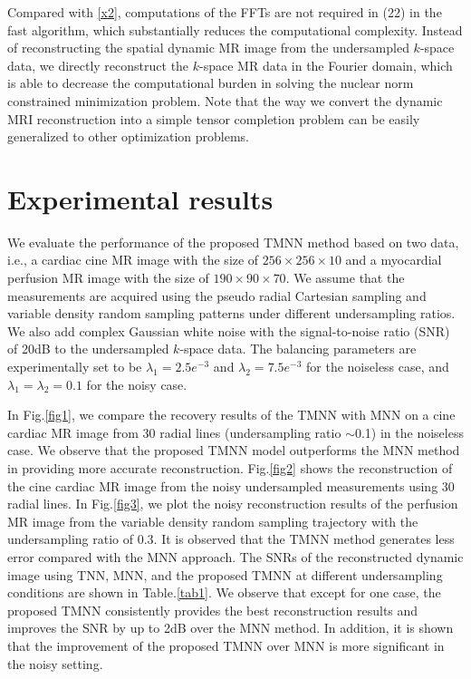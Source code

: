 \documentclass{article}
\begin{document}
Compared with \eqref{x2}, computations of the FFTs are not required in (22) in the fast algorithm, which substantially reduces the computational complexity. Instead of reconstructing the spatial dynamic MR image from the undersampled $k$-space data, we directly reconstruct the $k$-space MR data in the Fourier domain, which is able to decrease the computational burden in solving the nuclear norm constrained minimization problem. 
Note that the way we convert the dynamic MRI reconstruction into a simple tensor completion problem can be easily generalized to other optimization problems. 


\section{Experimental results}
\label{experiments}

We evaluate the performance of the proposed TMNN method based on two data, i.e., a cardiac cine MR image with the size of $256\times 256\times 10$ and a myocardial perfusion MR image with the size of $190\times 90\times 70$. We assume that the measurements are acquired using the pseudo radial Cartesian sampling \cite{ref_ktslr} and variable density random sampling patterns under different undersampling ratios. We also add complex Gaussian white noise with the signal-to-noise ratio (SNR) of 20dB to the undersampled $k$-space data. The balancing parameters are experimentally set to be $\lambda_1=2.5e^{-3}$ and $\lambda_2=7.5e^{-3}$ for the noiseless case, and $\lambda_1=\lambda_2=0.1$ for the noisy case. 

In Fig.\ref{fig1}, we compare the recovery results of the TMNN with MNN on a cine cardiac MR image from 30 radial lines (undersampling ratio $\sim$0.1) in the noiseless case. We observe that the proposed TMNN model outperforms the MNN method in providing more accurate reconstruction. Fig.\ref{fig2} shows the reconstruction of the cine cardiac MR image from the noisy undersampled measurements using 30 radial lines. In Fig.\ref{fig3}, we plot the noisy reconstruction results of the perfusion MR image from the variable density random sampling trajectory with the undersampling ratio of 0.3. It is observed that the TMNN method generates less error compared with the MNN approach. 
The SNRs of the reconstructed dynamic image using TNN, MNN, and the proposed TMNN at different undersampling conditions are shown in Table.\ref{tab1}. We observe that except for one case, the proposed TMNN consistently provides the best reconstruction results and improves the SNR by up to 2dB over the MNN method.
In addition, it is shown that the improvement of the proposed TMNN over MNN is more significant in the noisy setting.
\end{document}
